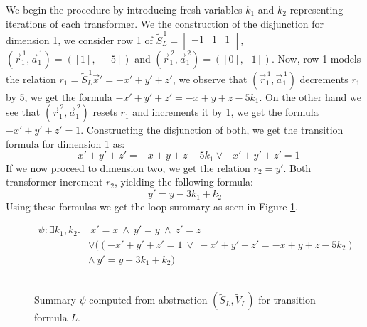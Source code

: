 We begin the procedure by introducing fresh variables $k_1$ and $k_2$ representing iterations of each transformer. We the construction of the disjunction for dimension 1, we consider row 1 of $\tilde{S}_L^{\, 1} = 	\begin{bmatrix}
	-1 & 1 & 1 \\
\end{bmatrix}$, $(\vec{r}^{\, 1}_1, \vec{a}^{\, 1}_1) = ([1], [-5])$ and $(\vec{r}^{\, 2}_1, \vec{a}^{\, 2}_1) = ([0], [1])$. Now, row 1 models the relation $ r_1 = \tilde{S}_L^{\, 1}\vec{x}' = -x' + y' + z'$, we observe that $(\vec{r}^{\, 1}_1, \vec{a}^{\, 1}_1)$ decrements $r_1$ by 5, we get the formula $-x' + y' + z' = -x + y + z - 5k_1$. On the other hand we see that $(\vec{r}^{\, 2}_1, \vec{a}^{\, 2}_1)$ resets $r_1$ and increments it by 1, we get the formula $-x' + y' + z' = 1$. Constructing the disjunction of both, we get the transition formula for dimension 1 as:
\begin{equation*}
	 -x' + y' + z' = -x + y + z - 5k_1 \lor -x' + y' + z' = 1
\end{equation*}
If we now proceed to dimension two, we get the relation $r_ 2 = y'$. Both transformer increment $r_2$, yielding the following formula:
\begin{equation*}
	y' = y - 3k_1 + k_2
\end{equation*}
Using these formulas we get the loop summary as seen in Figure \ref{loopSummary}.
\begin{figure}[H]
	\begin{align*}
		\psi: \exists k_1, k_2.&\ x' = x\ \land\ y' = y\ \land\ z' = z \\ &\lor ((-x' + y' + z' = 1\ \lor\ -x' + y' + z' = -x + y + z - 5k_2)\ \\ & \land\ y' = y - 3k_1 + k_2)\
	\end{align*}
	\caption{\\ Summary $\psi$ computed from \qvasr abstraction $(\tilde{S}_L, \tilde{V}_L)$ for transition formula $L$.}
	\label{loopSummary}
\end{figure}

